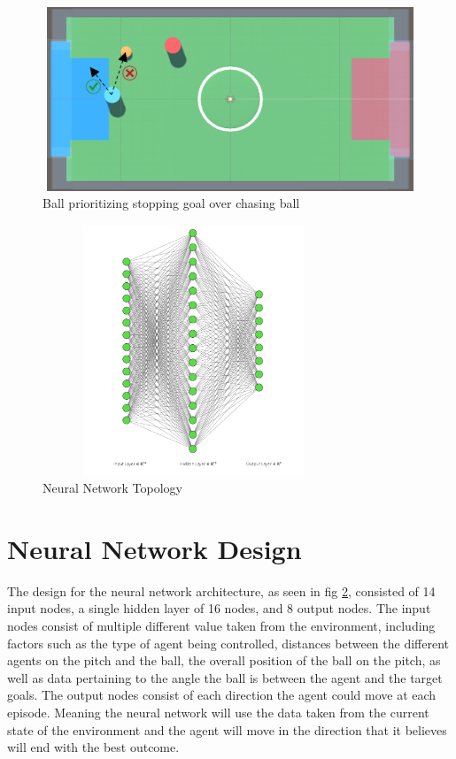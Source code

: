 \begin{figure}[H]
    \centering
    \includegraphics[width=115mm, height=55mm]{img/Image4.png}
    \caption{Ball prioritizing stopping goal over chasing ball}
    \label{fig:sd5}
\end{figure}

\begin{figure}[H]
    \centering
    \includegraphics[width=90mm, height=75mm]{img/NeuralNet.PNG}
    \caption{Neural Network Topology}
    \label{fig:NN-T}
\end{figure}

\section{Neural Network Design}
The design for the neural network architecture, as seen in fig \ref{fig:NN-T}, consisted of 14 input nodes, a single hidden layer of 16 nodes, and 8 output nodes. The input nodes consist of multiple different value taken from the environment, including factors such as the type of agent being controlled, distances between the different agents on the pitch and the ball, the overall position of the ball on the pitch, as well as data pertaining to the angle the ball is between the agent and the target goals. The output nodes consist of each direction the agent could move at each episode. Meaning the neural network will use the data taken from the current state of the environment and the agent will move in the direction that it believes will end with the best outcome.

